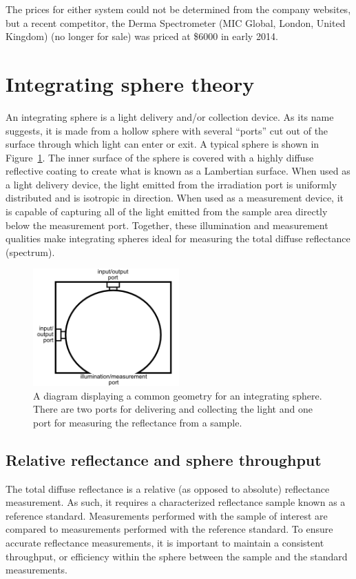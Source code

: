 The prices for either system could not be determined from the company websites, but a recent competitor, the Derma Spectrometer (MIC Global, London, United Kingdom) (no longer for sale) was priced at \$6000 in early 2014.

\section{Integrating sphere theory}
\label{sec:is_theory}
An integrating sphere is a light delivery and/or collection device. As its name suggests, it is made from a hollow sphere with several ``ports'' cut out of the surface through which light can enter or exit. A typical sphere is shown in Figure~\ref{fig:intro-is_sample}. The inner surface of the sphere is covered with a highly diffuse reflective coating to create what is known as a Lambertian surface. When used as a light delivery device, the light emitted from the irradiation port is uniformly distributed and is isotropic in direction. When used as a measurement device, it is capable of capturing all of the light emitted from the sample area directly below the measurement port. Together, these illumination and measurement qualities make integrating spheres ideal for measuring the total diffuse reflectance (spectrum).

\begin{figure}
	\centering \includegraphics[width=0.5\textwidth]{figures/intro-is_sample.png}
	\caption[Sample integrating sphere diagram]{\label{fig:intro-is_sample}A diagram displaying a common geometry for an integrating sphere. There are two ports for delivering and collecting the light and one port for measuring the reflectance from a sample.}
\end{figure}

\subsection{Relative reflectance and sphere throughput}
The total diffuse reflectance is a relative (as opposed to absolute) reflectance measurement. As such, it requires a characterized reflectance sample known as a reference standard. Measurements performed with the sample of interest are compared to measurements performed with the reference standard. To ensure accurate reflectance measurements, it is important to maintain a consistent throughput, or efficiency within the sphere between the sample and the standard measurements.\cite{Hanssen2002}

